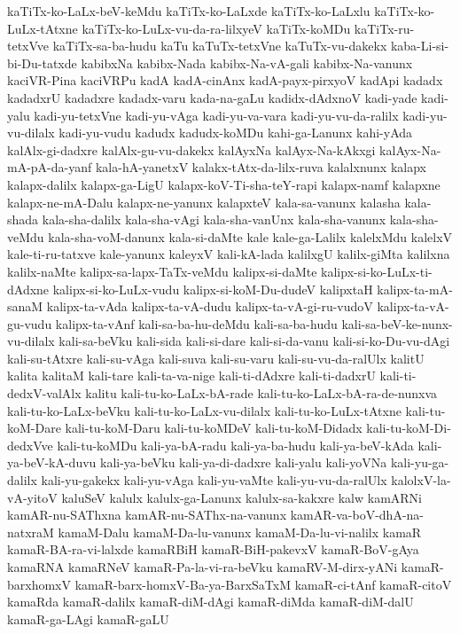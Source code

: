 {kaTiTx-ko-LaLx-beV-keMdu
kaTiTx-ko-LaLxde
kaTiTx-ko-LaLxlu
kaTiTx-ko-LuLx-tAtxne
kaTiTx-ko-LuLx-vu-da-ra-lilxyeV
kaTiTx-koMDu
kaTiTx-ru-tetxVve
kaTiTx-sa-ba-hudu
kaTu
kaTuTx-tetxVne
kaTuTx-vu-dakekx
kaba-Li-si-bi-Du-tatxde
kabibxNa
kabibx-Nada
kabibx-Na-vA-gali
kabibx-Na-vanunx
kaciVR-Pina
kaciVRPu
kadA
kadA-cinAnx
kadA-payx-pirxyoV
kadApi
kadadx
kadadxrU
kadadxre
kadadx-varu
kada-na-gaLu
kadidx-dAdxnoV
kadi-yade
kadi-yalu
kadi-yu-tetxVne
kadi-yu-vAga
kadi-yu-va-vara
kadi-yu-vu-da-ralilx
kadi-yu-vu-dilalx
kadi-yu-vudu
kadudx
kadudx-koMDu
kahi-ga-Lanunx
kahi-yAda
kalAlx-gi-dadxre
kalAlx-gu-vu-dakekx
kalAyxNa
kalAyx-Na-kAkxgi
kalAyx-Na-mA-pA-da-yanf
kala-hA-yanetxV
kalakx-tAtx-da-lilx-ruva
kalalxnunx
kalapx
kalapx-dalilx
kalapx-ga-LigU
kalapx-koV-Ti-sha-teY-rapi
kalapx-namf
kalapxne
kalapx-ne-mA-Dalu
kalapx-ne-yanunx
kalapxteV
kala-sa-vanunx
kalasha
kala-shada
kala-sha-dalilx
kala-sha-vAgi
kala-sha-vanUnx
kala-sha-vanunx
kala-sha-veMdu
kala-sha-voM-danunx
kala-si-daMte
kale
kale-ga-Lalilx
kalelxMdu
kalelxV
kale-ti-ru-tatxve
kale-yanunx
kaleyxV
kali-kA-lada
kalilxgU
kalilx-giMta
kalilxna
kalilx-naMte
kalipx-sa-lapx-TaTx-veMdu
kalipx-si-daMte
kalipx-si-ko-LuLx-ti-dAdxne
kalipx-si-ko-LuLx-vudu
kalipx-si-koM-Du-dudeV
kalipxtaH
kalipx-ta-mA-sanaM
kalipx-ta-vAda
kalipx-ta-vA-dudu
kalipx-ta-vA-gi-ru-vudoV
kalipx-ta-vA-gu-vudu
kalipx-ta-vAnf
kali-sa-ba-hu-deMdu
kali-sa-ba-hudu
kali-sa-beV-ke-nunx-vu-dilalx
kali-sa-beVku
kali-sida
kali-si-dare
kali-si-da-vanu
kali-si-ko-Du-vu-dAgi
kali-su-tAtxre
kali-su-vAga
kali-suva
kali-su-varu
kali-su-vu-da-ralUlx
kalitU
kalita
kalitaM
kali-tare
kali-ta-va-nige
kali-ti-dAdxre
kali-ti-dadxrU
kali-ti-dedxV-valAlx
kalitu
kali-tu-ko-LaLx-bA-rade
kali-tu-ko-LaLx-bA-ra-de-nunxva
kali-tu-ko-LaLx-beVku
kali-tu-ko-LaLx-vu-dilalx
kali-tu-ko-LuLx-tAtxne
kali-tu-koM-Dare
kali-tu-koM-Daru
kali-tu-koMDeV
kali-tu-koM-Didadx
kali-tu-koM-Di-dedxVve
kali-tu-koMDu
kali-ya-bA-radu
kali-ya-ba-hudu
kali-ya-beV-kAda
kali-ya-beV-kA-duvu
kali-ya-beVku
kali-ya-di-dadxre
kali-yalu
kali-yoVNa
kali-yu-ga-dalilx
kali-yu-gakekx
kali-yu-vAga
kali-yu-vaMte
kali-yu-vu-da-ralUlx
kalolxV-la-vA-yitoV
kaluSeV
kalulx
kalulx-ga-Lanunx
kalulx-sa-kakxre
kalw
kamARNi
kamAR-nu-SAThxna
kamAR-nu-SAThx-na-vanunx
kamAR-va-boV-dhA-na-natxraM
kamaM-Dalu
kamaM-Da-lu-vanunx
kamaM-Da-lu-vi-nalilx
kamaR
kamaR-BA-ra-vi-lalxde
kamaRBiH
kamaR-BiH-pakevxV
kamaR-BoV-gAya
kamaRNA
kamaRNeV
kamaR-Pa-la-vi-ra-beVku
kamaRV-M-dirx-yANi
kamaR-barxhomxV
kamaR-barx-homxV-Ba-ya-BarxSaTxM
kamaR-ci-tAnf
kamaR-citoV
kamaRda
kamaR-dalilx
kamaR-diM-dAgi
kamaR-diMda
kamaR-diM-dalU
kamaR-ga-LAgi
kamaR-gaLU
}
